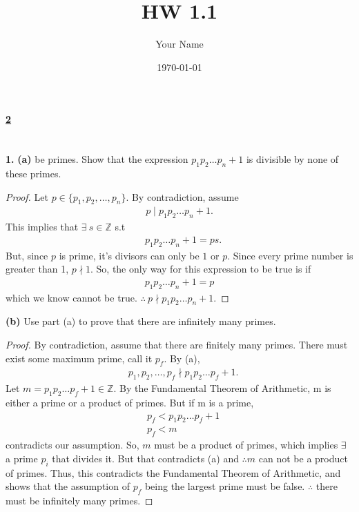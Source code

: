 \documentclass[12pt, letterpaper]{article}
\title{HW 1.1}
\author{Your Name}
\date{\today}
\begin{document}
\paragraph{\underline{2} \\ \\} 

\textbf{1.} \textbf{(a)}  be primes. Show that the expression $p_{1}p_{2}\ldots p_{n} + 1$ is divisible by none of these primes.
\begin{proof}
    Let $p\in \{p_{1}, p_{2}, \ldots, p_{n}\}$. By contradiction, assume
    \begin{align*}
        p \mid p_{1}p_{2}\ldots p_{n} + 1.
    \end{align*}
    This implies that $\exists \ s\in \mathbb{Z}$ s.t
    \begin{align*}
        & p_1p_2\ldots p_n + 1 = ps.
    \end{align*}
    But, since $p$ is prime, it's divisors can only be $1$ or $p$. Since every prime number is greater than 1, $p \nmid 1$. So, the only way for this expression to be true is if
    \begin{align*}
        p_1p_2\ldots p_n + 1 = p
    \end{align*}
    which we know cannot be true. $\therefore \ p \nmid p_1p_2\ldots p_n + 1$.
\end{proof}
\textbf{(b)} Use part (a) to prove that there are infinitely many primes.
\begin{proof}
    By contradiction, assume that there are finitely many primes. There must exist some maximum prime, call it $p_{f}$. By (a), 
    \begin{align*}
        &p_{1}, p_{2}, \ldots , p_{f} \nmid p_{1}p_{2}\ldots p_{f} + 1. 
    \end{align*}
    Let $m = p_{1}p_{2}\ldots p_{f} + 1 \in \mathbb{Z}$. By the Fundamental Theorem of Arithmetic, m is either a prime or a product of primes. But if m is a prime,
    \begin{align*}
        &p_{f} < p_{1}p_{2}\ldots p_{f} + 1 \\
        &p_{f} < m
    \end{align*}
    contradicts our assumption. So, $m$ must be a product of primes, which implies $\exists$ a prime $p_{i}$ that divides it. But that contradicts (a) and $\therefore m$ can not be a product of primes. Thus, this contradicts the Fundamental Theorem of Arithmetic, and shows that the assumption of $p_{f}$ being the largest prime must be false. $\therefore$ there must be infinitely many primes.
\end{proof}
\end{document}
